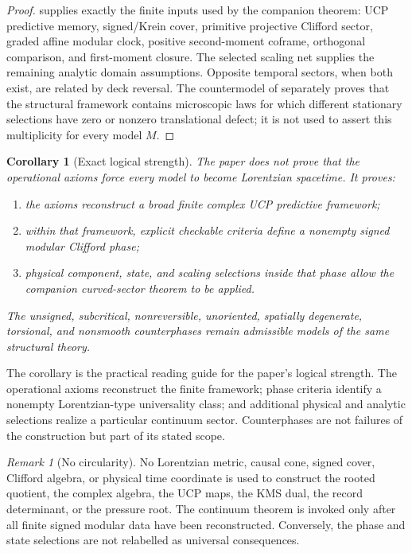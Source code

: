 \documentclass[11pt]{article}
\newtheorem{corollary}[theorem]{Corollary}
\theoremstyle{definition}
\theoremstyle{remark}
\newtheorem{remark}[theorem]{Remark}
\begin{document}
\begin{proof}
 supplies exactly the finite inputs used by the
companion theorem: UCP predictive memory, signed/Krein cover, primitive
projective Clifford sector, graded affine modular clock, positive
second-moment coframe, orthogonal comparison, and first-moment closure.  The
selected scaling net supplies the remaining analytic domain assumptions.
Opposite temporal sectors, when both exist, are related by deck reversal.
The countermodel of  separately proves that
the structural framework contains microscopic laws for which different
stationary selections have zero or nonzero translational defect; it is not used
to assert this multiplicity for every model $M$.
\end{proof}

\begin{corollary}[Exact logical strength]
\label{cor:genuine-phases}
The paper does not prove that the operational axioms force every model to become
Lorentzian spacetime.  It proves:
\begin{enumerate}[label=\textup{(\alph*)},leftmargin=2.4em]
\item the axioms reconstruct a broad finite complex UCP predictive framework;
\item within that framework, explicit checkable criteria define a nonempty
      signed modular Clifford phase;
\item physical component, state, and scaling selections inside that phase allow
      the companion curved-sector theorem to be applied.
\end{enumerate}
The unsigned, subcritical, nonreversible, unoriented, spatially degenerate,
torsional, and nonsmooth counterphases remain admissible models of the same
structural theory.
\end{corollary}

The corollary is the practical reading guide for the paper's logical strength.
The operational axioms reconstruct the finite framework; phase criteria identify
a nonempty Lorentzian-type universality class; and additional physical and
analytic selections realize a particular continuum sector.  Counterphases are not
failures of the construction but part of its stated scope.

\begin{remark}[No circularity]
No Lorentzian metric, causal cone, signed cover, Clifford algebra, or physical
time coordinate is used to construct the rooted quotient, the complex algebra,
the UCP maps, the KMS dual, the record determinant, or the pressure root.  The
continuum theorem is invoked only after all finite signed modular data have been
reconstructed.  Conversely, the phase and state selections are not relabelled
as universal consequences.
\end{remark}
\end{document}
